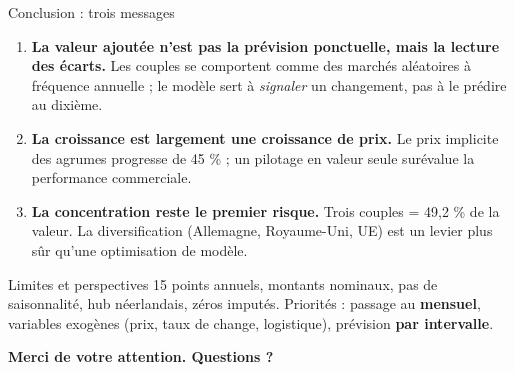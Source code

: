 \documentclass[aspectratio=169,10pt]{beamer}
\begin{document}
\begin{frame}{Conclusion : trois messages}
  \begin{enumerate}
    \item \textbf{La valeur ajoutée n'est pas la prévision ponctuelle, mais la
          lecture des écarts.} Les couples se comportent comme des marchés
          aléatoires à fréquence annuelle ; le modèle sert à \emph{signaler}
          un changement, pas à le prédire au dixième.
    \item \textbf{La croissance est largement une croissance de prix.}
          Le prix implicite des agrumes progresse de 45 \% ; un pilotage en
          valeur seule surévalue la performance commerciale.
    \item \textbf{La concentration reste le premier risque.}
          Trois couples = 49,2 \% de la valeur. La diversification
          (Allemagne, Royaume-Uni, UE) est un levier plus sûr qu'une
          optimisation de modèle.
  \end{enumerate}

  \vspace{0.3em}
  \begin{block}{Limites et perspectives}
    \small 15 points annuels, montants nominaux, pas de saisonnalité, hub
    néerlandais, zéros imputés. Priorités : passage au \textbf{mensuel},
    variables exogènes (prix, taux de change, logistique), prévision
    \textbf{par intervalle}.
  \end{block}

  \vfill
  \begin{center}
    \Large\color{vertfonce}\textbf{Merci de votre attention. Questions ?}
  \end{center}
\end{frame}
\end{document}

